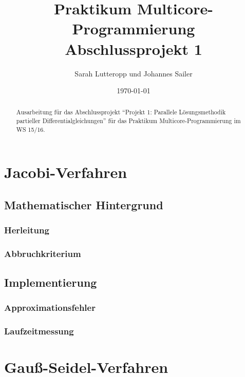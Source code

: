 \documentclass{article}
\title{Praktikum Multicore-Programmierung \\ Abschlussprojekt 1}
\author{Sarah Lutteropp und Johannes Sailer}
\date{\today}
\begin{document}
\maketitle


\begin{abstract}
Ausarbeitung für das Abschlussprojekt ``Projekt 1: Parallele Lösungsmethodik partieller Differentialgleichungen'' für das Praktikum Multicore-Programmierung im WS 15/16.
\end{abstract}

\section{Jacobi-Verfahren}
\subsection{Mathematischer Hintergrund}
\subsubsection{Herleitung}
\subsubsection{Abbruchkriterium}

\subsection{Implementierung}
\subsubsection{Approximationsfehler}
\subsubsection{Laufzeitmessung}

\section{Gauß-Seidel-Verfahren}
\end{document}
